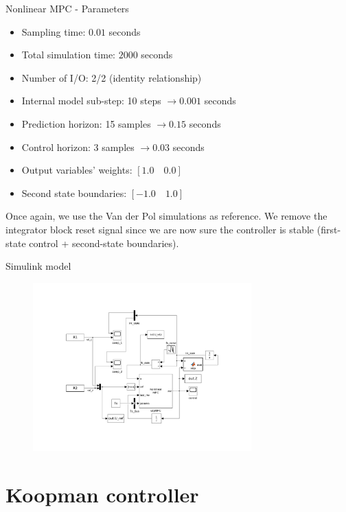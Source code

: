 \documentclass{beamer}
\begin{document}
\begin{frame}{Nonlinear MPC - Parameters}
    \begin{itemize}
        \item Sampling time: $0.01$ seconds
        \item Total simulation time: $2000$ seconds
        \item Number of I/O: 2/2 (identity relationship)
        \item Internal model sub-step: 10 steps $\rightarrow 0.001$ seconds
        \item Prediction horizon: 15 samples $\rightarrow 0.15$ seconds
        \item Control horizon: 3 samples $\rightarrow 0.03$ seconds
        \item Output variables' weights: $\left[1.0 \quad 0.0\right]$
        \item Second state boundaries: $\left[-1.0 \quad 1.0\right]$
    \end{itemize}

    Once again, we use the Van der Pol simulations as reference. We remove the integrator block reset signal since we are now sure the controller is stable (first-state control + second-state boundaries).
\end{frame}

\begin{frame}{Simulink model}
    \begin{figure}
        \centering
        \includegraphics[width=0.75\textwidth]{Simulink_VDP.png}
    \end{figure}
\end{frame}


\section{Koopman controller}
\end{document}
